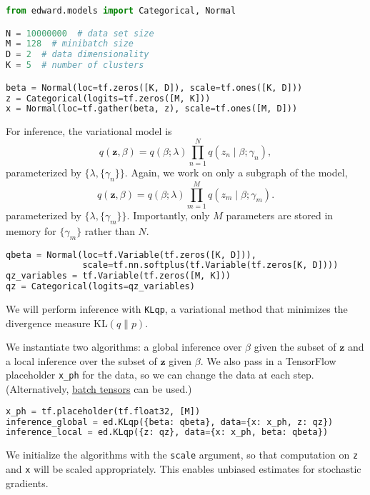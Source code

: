 \begin{lstlisting}[language=Python]
from edward.models import Categorical, Normal

N = 10000000  # data set size
M = 128  # minibatch size
D = 2  # data dimensionality
K = 5  # number of clusters

beta = Normal(loc=tf.zeros([K, D]), scale=tf.ones([K, D]))
z = Categorical(logits=tf.zeros([M, K]))
x = Normal(loc=tf.gather(beta, z), scale=tf.ones([M, D]))
\end{lstlisting}

For inference, the variational model is
\begin{equation*}
q(\mathbf{z}, \beta) =
q(\beta; \lambda) \prod_{n=1}^N q(z_n \mid \beta; \gamma_n),
\end{equation*}
parameterized by $\{\lambda, \{\gamma_n\}\}$.
Again, we work on only a subgraph of the model,
\begin{equation*}
q(\mathbf{z}, \beta) =
q(\beta; \lambda) \prod_{m=1}^M q(z_m \mid \beta; \gamma_m).
\end{equation*}
parameterized by $\{\lambda, \{\gamma_m\}\}$. Importantly, only $M$
parameters are stored in memory for $\{\gamma_m\}$ rather than $N$.

\begin{lstlisting}[language=Python]
qbeta = Normal(loc=tf.Variable(tf.zeros([K, D])),
               scale=tf.nn.softplus(tf.Variable(tf.zeros[K, D])))
qz_variables = tf.Variable(tf.zeros([M, K]))
qz = Categorical(logits=qz_variables)
\end{lstlisting}

We will perform inference with \texttt{KLqp}, a variational method
that minimizes the divergence measure $\text{KL}(q\| p)$.

We instantiate two algorithms: a global inference over $\beta$ given
the subset of $\mathbf{z}$ and a local inference over the subset of
$\mathbf{z}$ given $\beta$.
We also pass in a TensorFlow placeholder \texttt{x_ph} for the data,
so we can change the data at each step. (Alternatively,
\href{/api/data}{batch tensors} can be used.)

\begin{lstlisting}[language=Python]
x_ph = tf.placeholder(tf.float32, [M])
inference_global = ed.KLqp({beta: qbeta}, data={x: x_ph, z: qz})
inference_local = ed.KLqp({z: qz}, data={x: x_ph, beta: qbeta})
\end{lstlisting}

We initialize the algorithms with the \texttt{scale} argument, so that
computation on \texttt{z} and \texttt{x} will be scaled appropriately.
This enables unbiased estimates for stochastic gradients.

